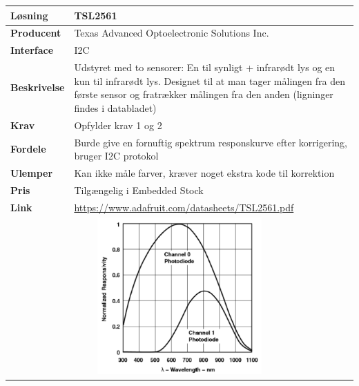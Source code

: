 \begin{table}[H] \centering
\begin{tabular}{|p{3cm}|p{11cm}|}
	\hline
	\textbf{Løsning}		
	    & TSL2561 
	\\ \hline
	\textbf{Producent} 		   
	    & Texas Advanced Optoelectronic Solutions Inc. 
	\\ \hline
	\textbf{Interface} 		
	    & I2C 
	\\ \hline
	\textbf{Beskrivelse} 	
	    & Udstyret med to sensorer: En til synligt + infrarødt lys og en kun til infrarødt lys. Designet til at man tager målingen fra den første sensor og fratrækker målingen fra den anden (ligninger findes i databladet) 
	\\ \hline
	\textbf{Krav} 			
	    & Opfylder krav 1 og 2 
	\\ \hline
	\textbf{Fordele}		
	    & Burde give en fornuftig spektrum responskurve efter korrigering, bruger I2C protokol 
	\\ \hline
	\textbf{Ulemper} 		
	    & Kan ikke måle farver, kræver noget ekstra kode til korrektion 
	\\ \hline
	\textbf{Pris} 			
	    & Tilgængelig i Embedded Stock 
	\\ \hline
	\textbf{Link} 			
	    & \url{https://www.adafruit.com/datasheets/TSL2561.pdf}
	\\ \hline
	\multicolumn{2}{|c|}{\includegraphics[height=6cm]{0_Filer/Figuer/Forudundersoegelse/TSL2561.png}} 	
    \\ \hline
\end{tabular}
\end{table}

